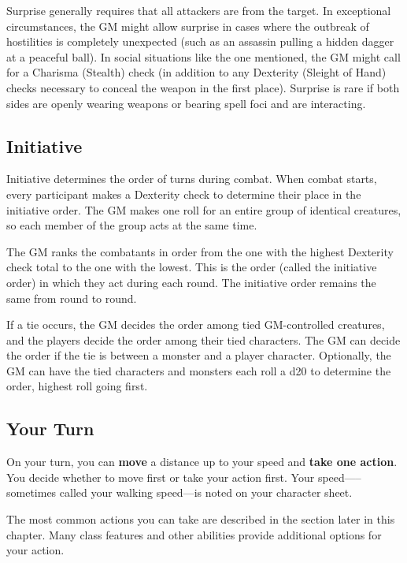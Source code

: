Surprise generally requires that all attackers are  from the target. In exceptional circumstances, the GM might allow surprise in cases where the outbreak of hostilities is completely unexpected (such as an assassin pulling a hidden dagger at a peaceful ball). In social situations like the one mentioned, the GM might call for a Charisma (Stealth) check (in addition to any Dexterity (Sleight of Hand) checks necessary to conceal the weapon in the first place). Surprise is rare if both sides are openly wearing weapons or bearing spell foci and are interacting.

\subsection{Initiative}

Initiative determines the order of turns during combat. When combat starts, every participant makes a Dexterity check to determine their place in the initiative order. The GM makes one roll for an entire group of identical creatures, so each member of the group acts at the same time.

The GM ranks the combatants in order from the one with the highest Dexterity check total to the one with the lowest. This is the order (called the initiative order) in which they act during each round. The initiative order remains the same from round to round.

If a tie occurs, the GM decides the order among tied GM-controlled creatures, and the players decide the order among their tied characters. The GM can decide the order if the tie is between a monster and a player character. Optionally, the GM can have the tied characters and monsters each roll a d20 to determine the order, highest roll going first.

\subsection{Your Turn}

On your turn, you can \textbf{move} a distance up to your speed and \textbf{take one action}. You decide whether to move first or take your action first. Your speed—--sometimes called your walking speed---is noted on your character sheet.

The most common actions you can take are described in the  section later in this chapter. Many class features and other abilities provide additional options for your action.

